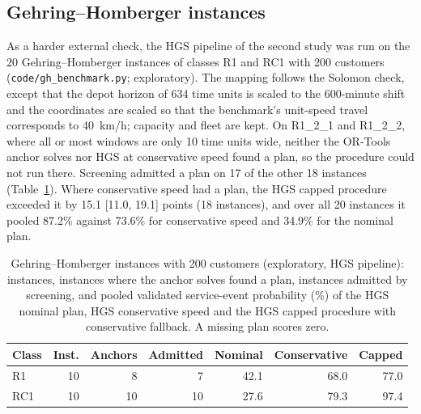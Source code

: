 \subsection{Gehring--Homberger instances}\label{sec:gh}

As a harder external check, the HGS pipeline of the second study was run on the 20 Gehring--Homberger instances of classes R1 and RC1 with 200 customers \cite{gehring1999} (\texttt{code/gh\_benchmark.py}; exploratory). The mapping follows the Solomon check, except that the depot horizon of 634 time units is scaled to the 600-minute shift and the coordinates are scaled so that the benchmark's unit-speed travel corresponds to 40~km/h; capacity and fleet are kept. On R1\_2\_1 and R1\_2\_2, where all or most windows are only 10 time units wide, neither the OR-Tools anchor solves nor HGS at conservative speed found a plan, so the procedure could not run there. Screening admitted a plan on 17 of the other 18 instances (Table~\ref{tab:gh}). Where conservative speed had a plan, the HGS capped procedure exceeded it by 15.1 [11.0, 19.1] points (18 instances), and over all 20 instances it pooled 87.2\% against 73.6\% for conservative speed and 34.9\% for the nominal plan.

\begin{table}[htbp]
\centering
\footnotesize
\setlength{\tabcolsep}{4pt}
\caption{Gehring--Homberger instances with 200 customers (exploratory, HGS pipeline): instances, instances where the anchor solves found a plan, instances admitted by screening, and pooled validated service-event probability (\%) of the HGS nominal plan, HGS conservative speed and the HGS capped procedure with conservative fallback. A missing plan scores zero.}
\label{tab:gh}
\begin{tabular}{@{}lrrrrrr@{}}
\toprule
Class & Inst. & Anchors & Admitted & Nominal & Conservative & Capped\\
\midrule
R1 & 10 & 8 & 7 & 42.1 & 68.0 & 77.0\\
RC1 & 10 & 10 & 10 & 27.6 & 79.3 & 97.4\\
\bottomrule
\end{tabular}
\end{table}
